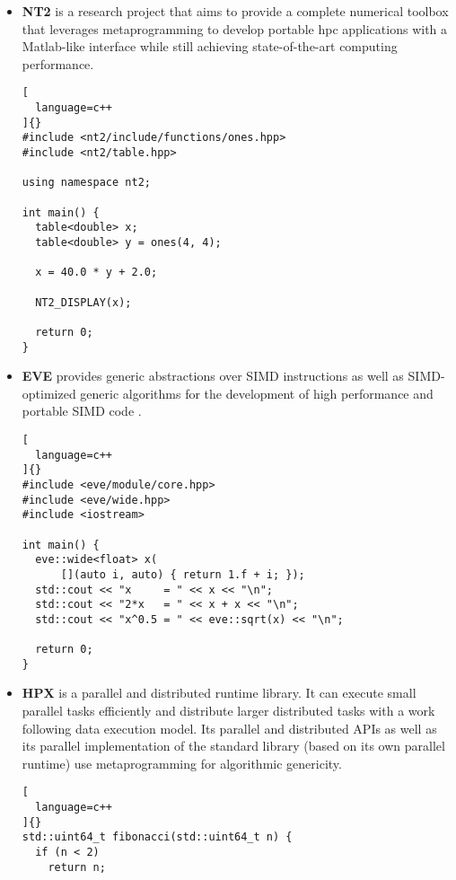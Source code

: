 \documentclass[../main]{subfiles}
\begin{document}
\begin{itemize}
\begin{lstlisting}[
  language=c++
]{}
  DynamicVector<int> c = a + b;

  std::cout << "c =\n" << c << "\n";
}
\end{lstlisting}

\item
\textbf{NT2} \cite{nt2} is a research project that aims to provide a complete
numerical toolbox that leverages metaprogramming to develop portable \gls{hpc}
applications with a Matlab-like interface while still achieving state-of-the-art
computing performance.

\begin{lstlisting}[
  language=c++
]{}
#include <nt2/include/functions/ones.hpp>
#include <nt2/table.hpp>

using namespace nt2;

int main() {
  table<double> x;
  table<double> y = ones(4, 4);

  x = 40.0 * y + 2.0;

  NT2_DISPLAY(x);

  return 0;
}
\end{lstlisting}

\item
\textbf{EVE} \cite{eve} provides generic abstractions over SIMD instructions
as well as SIMD-optimized generic algorithms for the development of
high performance and portable SIMD code \cite{hpcs2018-matvec}.

\begin{lstlisting}[
  language=c++
]{}
#include <eve/module/core.hpp>
#include <eve/wide.hpp>
#include <iostream>

int main() {
  eve::wide<float> x(
      [](auto i, auto) { return 1.f + i; });
  std::cout << "x     = " << x << "\n";
  std::cout << "2*x   = " << x + x << "\n";
  std::cout << "x^0.5 = " << eve::sqrt(x) << "\n";

  return 0;
}
\end{lstlisting}

\item
\textbf{HPX} \cite{hpx} is a \cpp parallel and distributed runtime library.
It can execute small parallel tasks efficiently and distribute
larger distributed tasks with a work following data execution model.
Its parallel and distributed APIs as well as its parallel implementation of
the standard library (based on its own parallel runtime) use metaprogramming
for algorithmic genericity.

\begin{lstlisting}[
  language=c++
]{}
std::uint64_t fibonacci(std::uint64_t n) {
  if (n < 2)
    return n;


\end{lstlisting}
\end{itemize}
\end{document}
